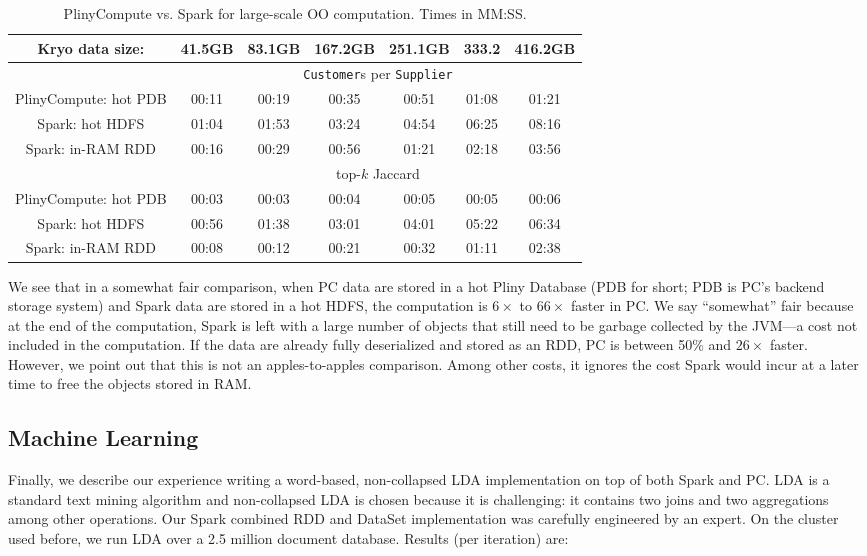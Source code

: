 \begin{table}[h!]
\begin{center}
\begin{tabular}{|c||c|c|c|c|c|c|}
\hline
Kryo data size: &41.5GB & 83.1GB & 167.2GB &251.1GB &333.2 &416.2GB \\
\hline
& \multicolumn{6}{c|}{\texttt{Customer}s per \texttt{Supplier}} \\
\hline
PlinyCompute: hot PDB & 00:11&	00:19&	00:35&	00:51&	01:08&	01:21 \\
Spark: hot HDFS & 01:04&	01:53&	03:24&	04:54&	06:25&	08:16\\
Spark: in-RAM RDD & 00:16& 	00:29& 	00:56& 	01:21& 	02:18& 	03:56\\
\hline
& \multicolumn{6}{c|}{top-$k$ Jaccard} \\
\hline
PlinyCompute: hot PDB & 00:03&	00:03&	00:04&	00:05&	00:05&	00:06 \\
Spark: hot HDFS & 00:56&	01:38&	03:01 & 04:01&	05:22&	06:34\\
Spark: in-RAM RDD & 00:08& 	00:12& 	00:21 & 00:32& 	01:11& 	02:38\\
\hline
\end{tabular}
\caption{PlinyCompute vs. Spark for large-scale OO computation. Times in MM:SS.}
\label{fig:TPC}
\end{center}
\end{table}

We see that in a somewhat fair comparison, when PC data are
stored in a hot Pliny Database (PDB for short; PDB is PC's backend storage system) and Spark data
are stored in
a hot HDFS, the computation is $6\times$ to $66\times$ faster in PC.  We say ``somewhat'' fair
because at the end of the computation, Spark is left with a large number of objects that still need to be 
garbage collected by the JVM---a cost not included in the computation. If the data are already
fully deserialized and stored as an RDD, PC is 
between 50\% and $26\times$ faster.  However, we point out that this is not an apples-to-apples comparison.
Among other costs, it ignores
the cost Spark would incur at a later time to free the objects stored in RAM.

\subsection {Machine Learning}
Finally, we describe our experience writing a word-based, non-collapsed LDA implementation \cite{jermaineExperimental} on top of
both Spark and PC.  LDA is a standard text mining algorithm and non-collapsed LDA is chosen because
it is challenging:
it contains two joins and two aggregations among other operations.
Our Spark combined RDD and DataSet        
implementation was carefully engineered by an expert.
On the cluster used before, we run LDA over a 2.5 million document database.  Results (per iteration) are:

